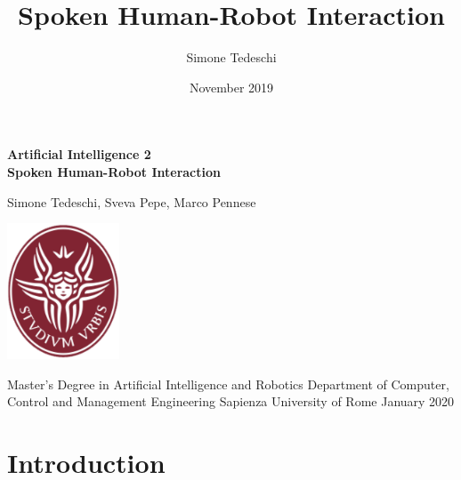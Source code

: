 \documentclass[12pt, a4paper]{article}
\author{Simone Tedeschi}
\title{Spoken Human-Robot Interaction}
\date{November 2019}
\begin{document}

\begin{titlepage}
    \begin{center}
        \vspace*{1cm}
        
        \LARGE
        \textbf{Artificial Intelligence 2 \\Spoken Human-Robot Interaction}
        
        
        \vspace{1.5cm}
        \Large
        Simone Tedeschi, Sveva Pepe, Marco Pennese
        
        \vfill
        
        \includegraphics[width=0.25\textwidth]{sapienza_logo.png}

        \vfill
        
        \large
        Master's Degree in Artificial Intelligence and Robotics\break\break
        Department of Computer, Control and Management Engineering\break\break
        Sapienza University of Rome\break\break
        January 2020

    \end{center}
\end{titlepage}



\pagebreak
\setcounter{page}{0}
\tableofcontents
\pagebreak

\section{Introduction}\label{1}
\end{document}
